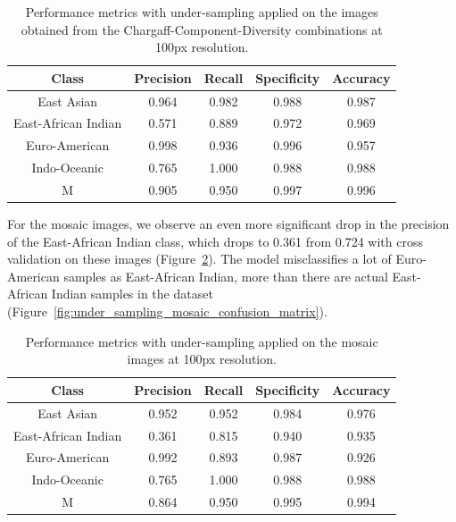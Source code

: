 \begin{table}[H]
	\centering
	\begin{tabular}{|c|c|c|c|c|}
		\hline
		\textbf{Class}      & \textbf{Precision} & \textbf{Recall} & \textbf{Specificity} & \textbf{Accuracy} \\
		\hline
		East Asian          & 0.964              & 0.982           & 0.988                & 0.987             \\
		East-African Indian & 0.571              & 0.889           & 0.972                & 0.969             \\
		Euro-American       & 0.998              & 0.936           & 0.996                & 0.957             \\
		Indo-Oceanic        & 0.765              & 1.000           & 0.988                & 0.988             \\
		M                   & 0.905              & 0.950           & 0.997                & 0.996             \\
		\hline
	\end{tabular}
	\caption{Performance metrics with under-sampling applied on the images obtained from the Chargaff-Component-Diversity
		combinations at 100px resolution.}
	\label{tab:under_sampling_performance_metrics}
\end{table}

For the mosaic images, we observe an even more significant drop in the precision of the East-African Indian class, which drops to 0.361 from
0.724 with cross validation on these images (Figure~\ref{tab:under_sampling_performance_metrics_mosaic}). The model misclassifies a lot of
Euro-American samples as East-African Indian, more than there are actual East-African Indian samples in the dataset
(Figure~\ref{fig:under_sampling_mosaic_confusion_matrix}).

\begin{table}[H]
	\centering
	\begin{tabular}{|c|c|c|c|c|}
		\hline
		\textbf{Class}      & \textbf{Precision} & \textbf{Recall} & \textbf{Specificity} & \textbf{Accuracy} \\
		\hline
		East Asian          & 0.952              & 0.952           & 0.984                & 0.976             \\
		East-African Indian & 0.361              & 0.815           & 0.940                & 0.935             \\
		Euro-American       & 0.992              & 0.893           & 0.987                & 0.926             \\
		Indo-Oceanic        & 0.765              & 1.000           & 0.988                & 0.988             \\
		M                   & 0.864              & 0.950           & 0.995                & 0.994             \\
		\hline
	\end{tabular}
	\caption{Performance metrics with under-sampling applied on the mosaic images at 100px resolution.}
	\label{tab:under_sampling_performance_metrics_mosaic}
\end{table}

